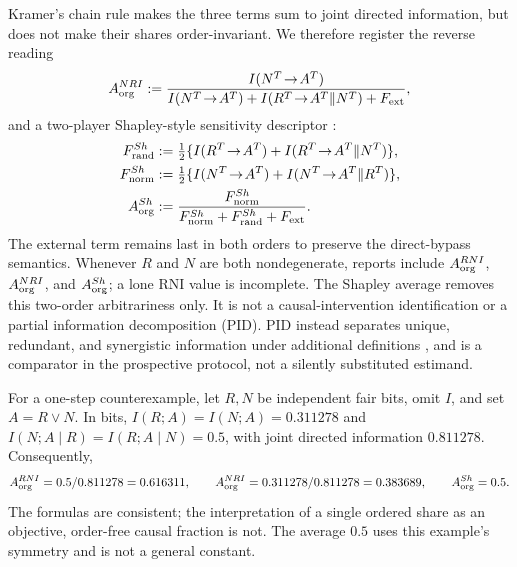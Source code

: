 Kramer's chain rule makes the three terms sum to joint directed information,
but does not make their shares order-invariant. We therefore register the
reverse reading
\[
A_{\mathrm{org}}^{NRI}:=\frac{I(N^T\!\to\!A^T)}
{I(N^T\!\to\!A^T)+I(R^T\!\to\!A^T\|N^T)+F_{\mathrm{ext}}},
\]
and a two-player Shapley-style sensitivity descriptor
\citep{shapley1953value}:
\begin{equation}\label{eq:aorg-shapley}
\begin{aligned}
\Frand^{Sh}&:=\tfrac12\{I(R^T\!\to\!A^T)+I(R^T\!\to\!A^T\|N^T)\},\\
\Fnorm^{Sh}&:=\tfrac12\{I(N^T\!\to\!A^T)+I(N^T\!\to\!A^T\|R^T)\},\\
\Aorg^{Sh}&:=\frac{\Fnorm^{Sh}}
{\Fnorm^{Sh}+\Frand^{Sh}+\Fext}.
\end{aligned}
\end{equation}
The external term remains last in both orders to preserve the direct-bypass
semantics. Whenever $R$ and $N$ are both nondegenerate, reports include
$A_{\mathrm{org}}^{RNI}$, $A_{\mathrm{org}}^{NRI}$, and $A_{\mathrm{org}}^{Sh}$; a lone RNI value is incomplete.
The Shapley average removes this two-order arbitrariness only. It is not a
causal-intervention identification or a partial information decomposition
(PID). PID instead separates unique, redundant, and synergistic information
under additional definitions \citep{williams2010nonnegative,ingel2022quantifying},
and is a comparator in the prospective protocol, not a silently substituted
estimand.

For a one-step counterexample, let $R,N$ be independent fair bits, omit $I$,
and set $A=R\lor N$. In bits,
$I(R;A)=I(N;A)=0.311278$ and
$I(N;A\mid R)=I(R;A\mid N)=0.5$, with joint directed information $0.811278$.
Consequently,
\[
A_{\mathrm{org}}^{RNI}=0.5/0.811278=0.616311,\qquad
A_{\mathrm{org}}^{NRI}=0.311278/0.811278=0.383689,\qquad
A_{\mathrm{org}}^{Sh}=0.5 .
\]
The formulas are consistent; the interpretation of a single ordered share as
an objective, order-free causal fraction is not. The average $0.5$ uses this
example's symmetry and is not a general constant.

